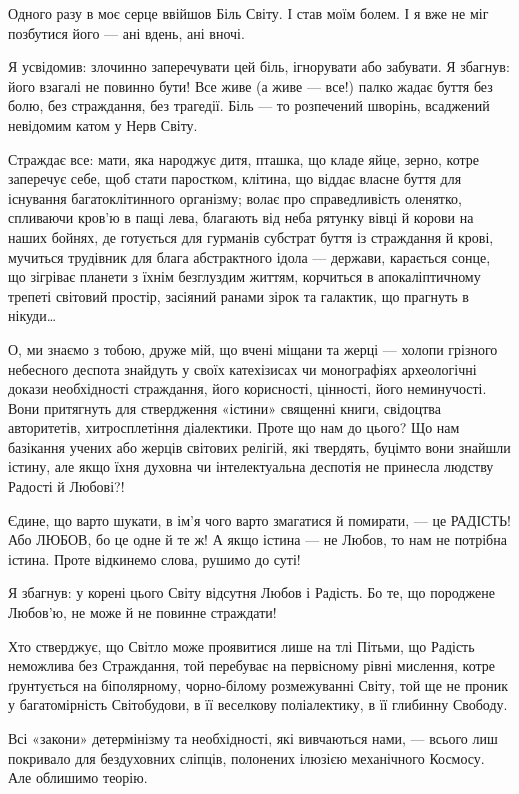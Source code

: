 Одного разу в моє серце ввійшов Біль Світу. І став моїм болем. І я вже не міг
позбутися його — ані вдень, ані вночі.

Я усвідомив: злочинно заперечувати цей біль, ігнорувати або забувати. Я
збагнув: його взагалі не повинно бути! Все живе (а живе — все!) палко жадає
буття без болю, без страждання, без трагедії. Біль — то розпечений шворінь,
всаджений невідомим катом у Нерв Світу.

Страждає все: мати, яка народжує дитя, пташка, що кладе яйце, зерно, котре
заперечує себе, щоб стати паростком, клітина, що віддає власне буття для
існування багатоклітинного організму; волає про справедливість оленятко,
спливаючи кров’ю в пащі лева, благають від неба рятунку вівці й корови на наших
бойнях, де готується для гурманів субстрат буття із страждання й крові,
мучиться трудівник для блага абстрактного ідола — держави, карається сонце, що
зігріває планети з їхнім безглуздим життям, корчиться в апокаліптичному трепеті
світовий простір, засіяний ранами зірок та галактик, що прагнуть в нікуди…

О, ми знаємо з тобою, друже мій, що вчені міщани та жерці — холопи грізного
небесного деспота знайдуть у своїх катехізисах чи монографіях археологічні
докази необхідності страждання, його корисності, цінності, його неминучості.
Вони притягнуть для ствердження «істини» священні книги, свідоцтва авторитетів,
хитросплетіння діалектики. Проте що нам до цього? Що нам базікання учених або
жерців світових релігій, які твердять, буцімто вони знайшли істину, але якщо
їхня духовна чи інтелектуальна деспотія не принесла людству Радості й Любові?!

Єдине, що варто шукати, в ім’я чого варто змагатися й помирати, — це РАДІСТЬ! Або ЛЮБОВ, бо це одне й те ж! А якщо істина — не Любов, то нам не потрібна істина. Проте відкинемо слова, рушимо до суті!

Я збагнув: у корені цього Світу відсутня Любов і Радість. Бо те, що породжене Любов’ю, не може й не повинне страждати!

Хто стверджує, що Світло може проявитися лише на тлі Пітьми, що Радість
неможлива без Страждання, той перебуває на первісному рівні мислення, котре
ґрунтується на біполярному, чорно-білому розмежуванні Світу, той ще не проник у
багатомірність Світобудови, в її веселкову поліалектику, в її глибинну Свободу.

Всі «закони» детермінізму та необхідності, які вивчаються нами, — всього лиш
покривало для бездуховних сліпців, полонених ілюзією механічного Космосу. Але
облишимо теорію.

